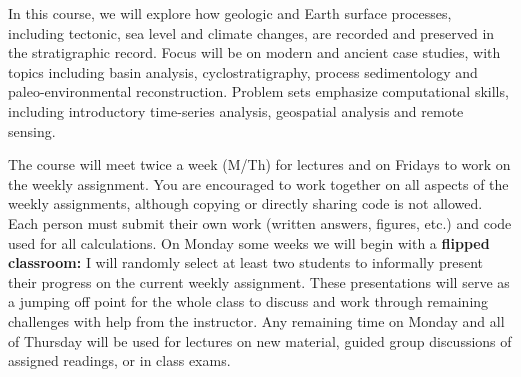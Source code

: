 In this course, we will explore how geologic and Earth surface processes, including tectonic, sea level and climate changes, are recorded and preserved in the stratigraphic record. Focus will be on modern and ancient case studies, with topics including basin analysis, cyclostratigraphy, process sedimentology and paleo-environmental reconstruction. Problem sets emphasize computational skills, including introductory time-series analysis, geospatial analysis and remote sensing.

The course will meet twice a week (M/Th) for lectures and on Fridays to work on the weekly assignment. You are encouraged to work together on all aspects of the weekly assignments, although copying or directly sharing code is not allowed. Each person must submit their own work (written answers, figures, etc.) and code used for all calculations. On Monday some weeks we will begin with a {\color{mygreen2}\textbf{flipped classroom:}} I will randomly select at least two students to informally present their progress on the current weekly assignment. These presentations will serve as a jumping off point for the whole class to discuss and work through remaining challenges with help from the instructor. Any remaining time on Monday and all of Thursday will be used for lectures on new material, guided group discussions of assigned readings, or in class exams.

